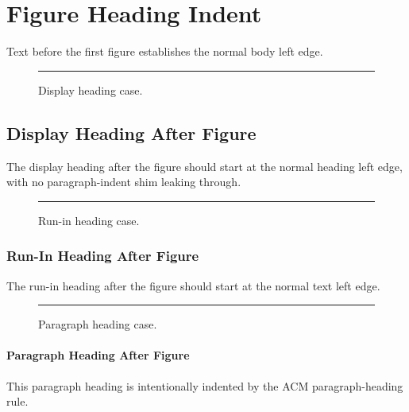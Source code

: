 \documentclass[acmsmall,nonacm]{acmart}
\begin{document}
\thispagestyle{empty}

\section{Figure Heading Indent}
Text before the first figure establishes the normal body left edge.

\begin{figure}[h]
\centering
\rule{3cm}{1cm}
\caption{Display heading case.}
\end{figure}

\subsection{Display Heading After Figure}
The display heading after the figure should start at the normal heading left
edge, with no paragraph-indent shim leaking through.

\begin{figure}[h]
\centering
\rule{3cm}{1cm}
\caption{Run-in heading case.}
\end{figure}

\subsubsection{Run-In Heading After Figure}
The run-in heading after the figure should start at the normal text left edge.

\begin{figure}[h]
\centering
\rule{3cm}{1cm}
\caption{Paragraph heading case.}
\end{figure}

\paragraph{Paragraph Heading After Figure}
This paragraph heading is intentionally indented by the ACM paragraph-heading
rule.
\end{document}
